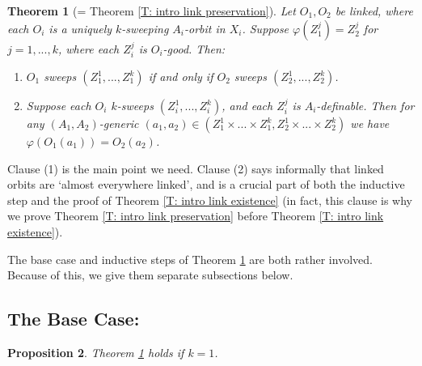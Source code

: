 \documentclass{amsart}
\newtheorem{theorem}{Theorem}[section]
\newtheorem{proposition}[theorem]{Proposition}
\theoremstyle{definition}
\begin{document}
\begin{theorem}[= Theorem \ref{T: intro link preservation}]\label{T: preservation}
    Let $O_1,O_2$ be linked, where each $O_i$ is a uniquely $k$-sweeping $A_i$-orbit in $X_i$. Suppose $\varphi(Z_1^j)=Z_2^j$ for $j=1,...,k$, where each $Z_i^j$ is $O_i$-good. Then:
    \begin{enumerate}
        \item $O_1$ sweeps $(Z_1^1,...,Z_1^k)$ if and only if $O_2$ sweeps $(Z_2^1,...,Z_2^k)$.
        \item Suppose each $O_i$ $k$-sweeps $(Z_i^1,...,Z_i^k)$, and each $Z_i^j$ is $A_i$-definable. Then for any $(A_1,A_2)$-generic $(a_1,a_2)\in(Z_1^1\times...\times Z_1^k,Z_2^1\times...\times Z_2^k)$ we have $\varphi(O_1(a_1))=O_2(a_2)$.
    \end{enumerate}
\end{theorem}

Clause (1) is the main point we need. Clause (2) says informally that linked orbits are `almost everywhere linked', and is a crucial part of both the inductive step and the proof of Theorem \ref{T: intro link existence} (in fact, this clause is why we prove Theorem \ref{T: intro link preservation} before Theorem \ref{T: intro link existence}).

The base case and inductive steps of Theorem \ref{T: preservation} are both rather involved. Because of this, we give them separate subsections below.

\subsection{The Base Case:}

\begin{proposition}\label{P: base case}
    Theorem \ref{T: preservation} holds if $k=1$.
\end{proposition}
\end{document}
